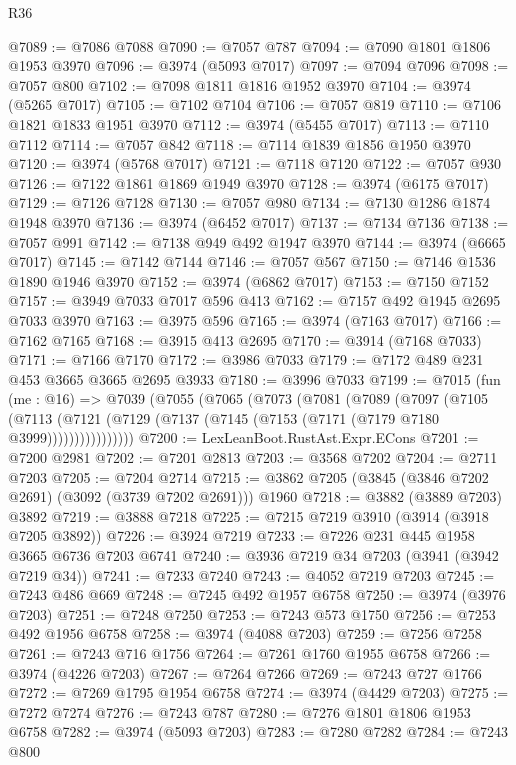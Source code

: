 \begin{lexlean}{R36}
\begin{coremodule}
@7089 := @7086 @7088
@7090 := @7057 @787
@7094 := @7090 @1801 @1806 @1953 @3970
@7096 := @3974 (@5093 @7017)
@7097 := @7094 @7096
@7098 := @7057 @800
@7102 := @7098 @1811 @1816 @1952 @3970
@7104 := @3974 (@5265 @7017)
@7105 := @7102 @7104
@7106 := @7057 @819
@7110 := @7106 @1821 @1833 @1951 @3970
@7112 := @3974 (@5455 @7017)
@7113 := @7110 @7112
@7114 := @7057 @842
@7118 := @7114 @1839 @1856 @1950 @3970
@7120 := @3974 (@5768 @7017)
@7121 := @7118 @7120
@7122 := @7057 @930
@7126 := @7122 @1861 @1869 @1949 @3970
@7128 := @3974 (@6175 @7017)
@7129 := @7126 @7128
@7130 := @7057 @980
@7134 := @7130 @1286 @1874 @1948 @3970
@7136 := @3974 (@6452 @7017)
@7137 := @7134 @7136
@7138 := @7057 @991
@7142 := @7138 @949 @492 @1947 @3970
@7144 := @3974 (@6665 @7017)
@7145 := @7142 @7144
@7146 := @7057 @567
@7150 := @7146 @1536 @1890 @1946 @3970
@7152 := @3974 (@6862 @7017)
@7153 := @7150 @7152
@7157 := @3949 @7033 @7017 @596 @413
@7162 := @7157 @492 @1945 @2695 @7033 @3970
@7163 := @3975 @596
@7165 := @3974 (@7163 @7017)
@7166 := @7162 @7165
@7168 := @3915 @413 @2695
@7170 := @3914 (@7168 @7033)
@7171 := @7166 @7170
@7172 := @3986 @7033
@7179 := @7172 @489 @231 @453 @3665 @3665 @2695 @3933
@7180 := @3996 @7033
@7199 := @7015
    (fun (me : @16) =>
    @7039
      (@7055
        (@7065
          (@7073
            (@7081
              (@7089
                (@7097
                  (@7105
                    (@7113
                      (@7121 (@7129 (@7137 (@7145 (@7153 (@7171 (@7179 @7180 @3999))))))))))))))))
@7200 := LexLeanBoot.RustAst.Expr.ECons
@7201 := @7200 @2981
@7202 := @7201 @2813
@7203 := @3568 @7202
@7204 := @2711 @7203
@7205 := @7204 @2714
@7215 := @3862 @7205 (@3845 (@3846 @7202 @2691) (@3092 (@3739 @7202 @2691))) @1960
@7218 := @3882 (@3889 @7203) @3892
@7219 := @3888 @7218
@7225 := @7215 @7219 @3910 (@3914 (@3918 @7205 @3892))
@7226 := @3924 @7219
@7233 := @7226 @231 @445 @1958 @3665 @6736 @7203 @6741
@7240 := @3936 @7219 @34 @7203 (@3941 (@3942 @7219 @34))
@7241 := @7233 @7240
@7243 := @4052 @7219 @7203
@7245 := @7243 @486 @669
@7248 := @7245 @492 @1957 @6758
@7250 := @3974 (@3976 @7203)
@7251 := @7248 @7250
@7253 := @7243 @573 @1750
@7256 := @7253 @492 @1956 @6758
@7258 := @3974 (@4088 @7203)
@7259 := @7256 @7258
@7261 := @7243 @716 @1756
@7264 := @7261 @1760 @1955 @6758
@7266 := @3974 (@4226 @7203)
@7267 := @7264 @7266
@7269 := @7243 @727 @1766
@7272 := @7269 @1795 @1954 @6758
@7274 := @3974 (@4429 @7203)
@7275 := @7272 @7274
@7276 := @7243 @787
@7280 := @7276 @1801 @1806 @1953 @6758
@7282 := @3974 (@5093 @7203)
@7283 := @7280 @7282
@7284 := @7243 @800

\end{coremodule}
\end{lexlean}
